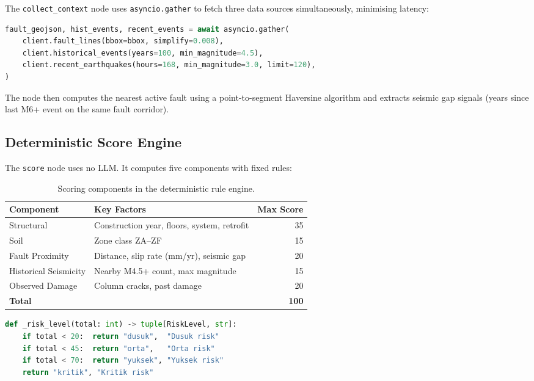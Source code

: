 \documentclass[11pt,a4paper]{article}
\begin{document}
The \texttt{collect\_context} node uses \texttt{asyncio.gather} to fetch three data sources simultaneously, minimising latency:

\begin{lstlisting}[style=codestyle, language=Python]
fault_geojson, hist_events, recent_events = await asyncio.gather(
    client.fault_lines(bbox=bbox, simplify=0.008),
    client.historical_events(years=100, min_magnitude=4.5),
    client.recent_earthquakes(hours=168, min_magnitude=3.0, limit=120),
)
\end{lstlisting}

The node then computes the nearest active fault using a point-to-segment Haversine algorithm and extracts seismic gap signals (years since last M6+ event on the same fault corridor).

\subsection{Deterministic Score Engine}

The \texttt{score} node uses no LLM. It computes five components with fixed rules:

\begin{table}[H]
\centering
\begin{tabular}{@{}llr@{}}
\toprule
\textbf{Component} & \textbf{Key Factors} & \textbf{Max Score} \\
\midrule
Structural         & Construction year, floors, system, retrofit    & 35 \\
Soil               & Zone class ZA--ZF                              & 15 \\
Fault Proximity    & Distance, slip rate (mm/yr), seismic gap       & 20 \\
Historical Seismicity & Nearby M4.5+ count, max magnitude           & 15 \\
Observed Damage    & Column cracks, past damage                     & 20 \\
\midrule
\textbf{Total}     &                                                & \textbf{100} \\
\bottomrule
\end{tabular}
\caption{Scoring components in the deterministic rule engine.}
\end{table}

\begin{lstlisting}[style=codestyle, language=Python]
def _risk_level(total: int) -> tuple[RiskLevel, str]:
    if total < 20:  return "dusuk",  "Dusuk risk"
    if total < 45:  return "orta",   "Orta risk"
    if total < 70:  return "yuksek", "Yuksek risk"
    return "kritik", "Kritik risk"
\end{lstlisting}
\end{document}
